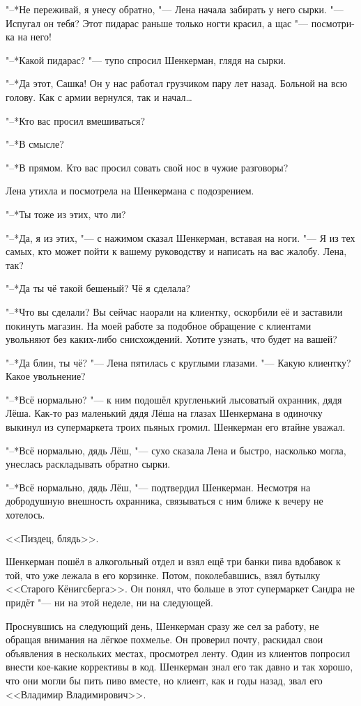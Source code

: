 "--*Не переживай, я унесу обратно, "--- Лена начала забирать у него сырки.
"--- Испугал он тебя?
Этот пидарас раньше только ногти красил, а щас "--- посмотри-ка на него!

"--*Какой пидарас? "--- тупо спросил Шенкерман, глядя на сырки.

"--*Да этот, Сашка!
Он у нас работал грузчиком пару лет назад.
Больной на всю голову.
Как с армии вернулся, так и начал\ldots{}

"--*Кто вас просил вмешиваться?

"--*В смысле?

"--*В прямом.
Кто вас просил совать свой нос в чужие разговоры?

Лена утихла и посмотрела на Шенкермана с подозрением.

"--*Ты тоже из этих, что ли?

"--*Да, я из этих, "--- с нажимом сказал Шенкерман, вставая на ноги.
"--- Я из тех самых, кто может пойти к вашему руководству и написать на вас жалобу.
Лена, так?

"--*Да ты чё такой бешеный?
Чё я сделала?

"--*Что вы сделали?
Вы сейчас наорали на клиентку, оскорбили её и заставили покинуть магазин.
На моей работе за подобное обращение с клиентами увольняют без каких-либо снисхождений.
Хотите узнать, что будет на вашей?

"--*Да блин, ты чё? "--- Лена пятилась с круглыми глазами.
"--- Какую клиентку?
Какое увольнение?

"--*Всё нормально? "--- к ним подошёл кругленький лысоватый охранник, дядя Лёша.
Как-то раз маленький дядя Лёша на глазах Шенкермана в одиночку выкинул из супермаркета троих пьяных громил.
Шенкерман его втайне уважал.

"--*Всё нормально, дядь Лёш, "--- сухо сказала Лена и быстро, насколько могла, унеслась раскладывать обратно сырки.

"--*Всё нормально, дядь Лёш, "--- подтвердил Шенкерман.
Несмотря на добродушную внешность охранника, связываться с ним ближе к вечеру не хотелось.

<<Пиздец, блядь>>.

Шенкерман пошёл в алкогольный отдел и взял ещё три банки пива вдобавок к той, что уже лежала в его корзинке.
Потом, поколебавшись, взял бутылку <<Старого Кёнигсберга>>.
Он понял, что больше в этот супермаркет Сандра не придёт "--- ни на этой неделе, ни на следующей.

\asterism

Проснувшись на следующий день, Шенкерман сразу же сел за работу, не обращая внимания на лёгкое похмелье.
Он проверил почту, раскидал свои объявления в нескольких местах, просмотрел ленту.
Один из клиентов попросил внести кое-какие коррективы в код.
Шенкерман знал его так давно и так хорошо, что они могли бы пить пиво вместе, но клиент, как и годы назад, звал его <<Владимир Владимирович>>.

